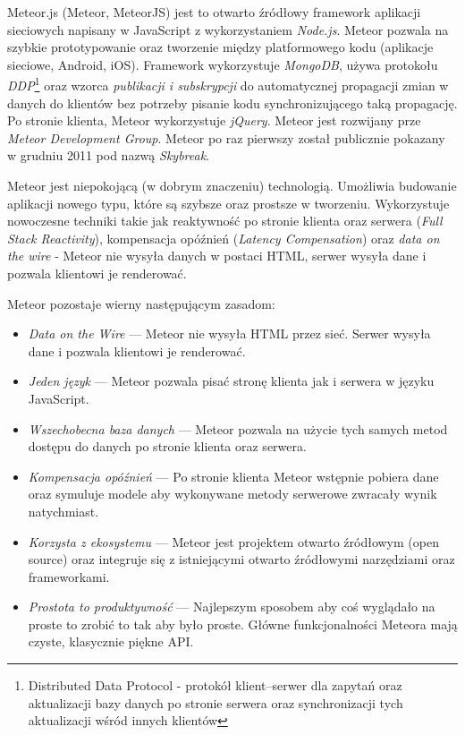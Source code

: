 Meteor.js (Meteor, MeteorJS) jest to otwarto źródłowy framework aplikacji sieciowych napisany w JavaScript z wykorzystaniem \emph{Node.js}. Meteor pozwala na szybkie prototypowanie oraz tworzenie między platformowego kodu (aplikacje sieciowe, Android, iOS). Framework wykorzystuje \emph{MongoDB}, używa protokołu \emph{DDP}\footnote{Distributed Data Protocol - protokół klient--serwer dla zapytań oraz aktualizacji bazy danych po stronie serwera oraz synchronizacji tych aktualizacji wśród innych klientów} oraz wzorca \emph{publikacji i subskrypcji} do automatycznej propagacji zmian w danych do klientów bez potrzeby pisanie kodu synchronizującego taką propagację. Po stronie klienta, Meteor wykorzystuje \emph{jQuery}. Meteor jest rozwijany prze \textit{Meteor Development Group}. Meteor po raz pierwszy został publicznie pokazany w grudniu 2011 pod nazwą \textit{Skybreak}\cite{meteorWiki}.

Meteor jest niepokojącą (w dobrym znaczeniu) technologią. Umożliwia budowanie aplikacji nowego typu, które są szybsze oraz prostsze w tworzeniu. Wykorzystuje nowoczesne techniki takie jak reaktywność po stronie klienta oraz serwera (\textit{Full Stack Reactivity}), kompensacja opóźnień (\textit{Latency Compensation}) oraz \textit{data on the wire} - Meteor nie wysyła danych w postaci HTML, serwer wysyła dane i pozwala klientowi je renderować\cite{strack15}.


Meteor pozostaje wierny następującym zasadom\cite{meteorDocs}: 
\begin{itemize}
 \item \textit{Data on the Wire} --- Meteor nie wysyła HTML przez sieć. Serwer wysyła dane i pozwala klientowi je renderować.
 \item \textit{Jeden język} --- Meteor pozwala pisać stronę klienta jak i serwera w języku JavaScript.
 \item \textit{Wszechobecna baza danych} --- Meteor pozwala na użycie tych samych metod dostępu do danych po stronie klienta oraz serwera.
 \item \textit{Kompensacja opóźnień} --- Po stronie klienta Meteor wstępnie pobiera dane oraz symuluje modele aby wykonywane metody serwerowe zwracały wynik natychmiast.
 \item \textit{Korzysta z ekosystemu} --- Meteor jest projektem otwarto źródłowym (open source) oraz integruje się z istniejącymi otwarto źródłowymi narzędziami oraz frameworkami.
 \item \textit{Prostota to produktywność} --- Najlepszym sposobem aby coś wyglądało na proste to zrobić to tak aby było proste. Główne funkcjonalności Meteora mają czyste, klasycznie piękne API.
\end{itemize}

